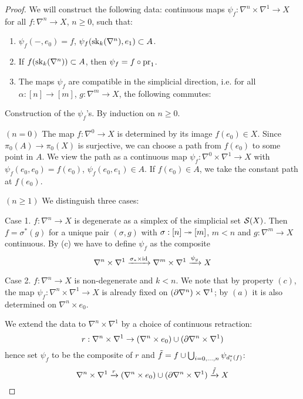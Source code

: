\begin{proof}
We will construct the following data: continuous maps $\psi_f:\nabla^n\times\nabla^1\to X$ for all $f:\nabla^n\to X$, $n\geq 0$, such that:
\begin{enumerate}[label={(\alph*)}]
    \item $\psi_f(-,e_0)=f$, $\psi_f(\sk_k(\ns),e_1)\subset A$.
    \item If $f(\sk_k(\ns))\subset A$, then $\psi_f=f\circ\pr_1$.
    \item The maps $\psi_f$ are compatible in the simplicial direction, i.e. for all $\alpha:[n]\to[m]$, $g:\nabla^m\to X$, the following commutes:
    \begin{center}
    \end{center}
\end{enumerate}

Construction of the $\psi_f$'s. By induction on $n\geq0$.

$(n=0)$ The map $f:\nabla^0\to X$ is determined by its image $f(e_0)\in X$. Since $\pi_0(A)\to\pi_0(X)$ is surjective, we can choose a path from $f(e_0)$ to some point in $A$. We view the path as a continuous map $\psi_f:\nabla^0\times\nabla^1\to X$ with $\psi_f(e_0,e_0)=f(e_0)$, $\psi_f(e_0,e_1)\in A$. If $f(e_0)\in A$, we take the constant path at $f(e_0)$.

$(n\geq1)$ We distinguish three cases:

Case 1. $f:\nabla^n\to X$ is degenerate as a simplex of the simplicial set $\S(X)$. Then $f=\sigma^*(g)$ for a unique pair $(\sigma,g)$ with $\sigma:[n]\onto[m]$, $m<n$ and $g:\nabla^m\to X$ continuous. By (c) we have to define $\psi_f$ as the composite
\[\nabla^n\times\nabla^1\xto{\sigma_*\times\id}\nabla^m\times\nabla^1\xto{\psi_g} X\]

Case 2. $f:\nabla^n\to X$ is non-degenerate and $k<n$. We note that by property $(c)$, the map $\psi_f:\nabla^n\times\nabla^1\to X$ is already fixed on $(\de\nabla^n)\times\nabla^1$; by $(a)$ it is also determined on $\nabla^n\times e_0$.

We extend the data to $\nabla^n\times\nabla^1$ by a choice of continuous retraction:
\[r:\nabla^n\times\nabla^1\to (\nabla^n\times e_0)\cup(\de\nabla^n\times\nabla^1)\]
hence set $\psi_f$ to be the composite of $r$ and $\til f=f\cup\bigcup_{i=0,\dots,n}\psi_{d_i^*(f)}$\normalmarginpar{}:
\[\ns\times\sx{1}\xto{r}(\nabla^n\times e_0)\cup(\de\nabla^n\times\nabla^1)\xto{\til f} X\]


\end{proof}
